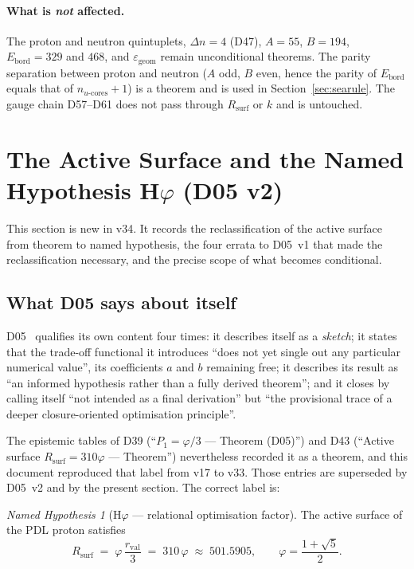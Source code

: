 \documentclass[11pt,a4paper]{article}
\theoremstyle{plain}
\theoremstyle{definition}
\theoremstyle{remark}
\newtheorem{namedhyp}[theorem]{Named Hypothesis}
\newcommand{\rval}{r_{\mathrm{val}}}
\newcommand{\Rsurf}{R_{\mathrm{surf}}}
\begin{document}
\paragraph{What is \emph{not} affected.} The proton and neutron quintuplets, $\Delta n=4$ (D47), $A=55$, $B=194$, $E_{\mathrm{bord}}=329$ and $468$, and $\varepsilon_{\mathrm{geom}}$ remain unconditional theorems. The parity separation between proton and neutron ($A$ odd, $B$ even, hence the parity of $E_{\mathrm{bord}}$ equals that of $n_{u\text{-cores}}+1$) is a theorem and is used in Section~\ref{sec:searule}. The gauge chain D57--D61 does not pass through $\Rsurf$ or $k$ and is untouched.

\section{The Active Surface and the Named Hypothesis \texorpdfstring{H$\varphi$}{Hphi} (D05 v2)}
\label{sec:Hphi}

This section is new in v34. It records the reclassification of the active surface from theorem to named hypothesis, the four errata to D05~v1 that made the reclassification necessary, and the precise scope of what becomes conditional.

\subsection{What D05 says about itself}
\label{subsec:D05self}
D05~\cite{D05} qualifies its own content four times: it describes itself as a \emph{sketch}; it states that the trade-off functional it introduces ``does not yet single out any particular numerical value'', its coefficients $a$ and $b$ remaining free; it describes its result as ``an informed hypothesis rather than a fully derived theorem''; and it closes by calling itself ``not intended as a final derivation'' but ``the provisional trace of a deeper closure-oriented optimisation principle''.

\textcolor{negativered}{The epistemic tables of D39 (``$P_1=\varphi/3$ --- Theorem (D05)'') and D43 (``Active surface $\Rsurf=310\varphi$ --- Theorem'') nevertheless recorded it as a theorem, and this document reproduced that label from v17 to v33.} Those entries are superseded by D05~v2 and by the present section. The correct label is:

\begin{namedhyp}[H$\varphi$ --- relational optimisation factor]
\label{hyp:Hphi}
The active surface of the PDL proton satisfies
\[
\Rsurf \;=\; \varphi\,\frac{\rval}{3} \;=\; 310\,\varphi \;\approx\; 501.5905,
\qquad \varphi=\frac{1+\sqrt5}{2}.
\]
\end{namedhyp}
\end{document}
